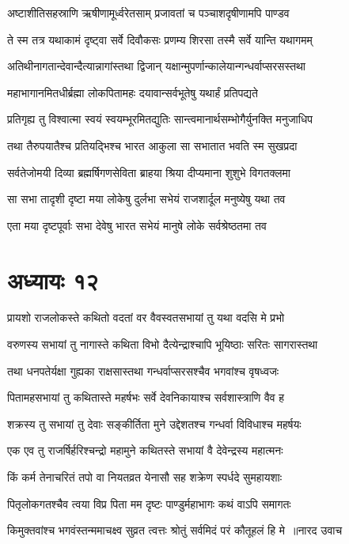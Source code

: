 \twolineshloka
{अष्टाशीतिसहस्राणि ऋषीणामूर्ध्वरेतसाम्}
{प्रजावतां च पञ्चाशदृषीणामपि पाण्डव}


\twolineshloka
{ते स्म तत्र यथाकामं दृष्ट्वा सर्वे दिवौकसः}
{प्रणम्य शिरसा तस्मै सर्वे यान्ति यथागमम्}


\twolineshloka
{अतिथीनागतान्देवान्दैत्यान्नागांस्तथा द्विजान्}
{यक्षान्मुपर्णान्कालेयान्गन्धर्वाप्सरसस्तथा}


\twolineshloka
{महाभागानमितधीर्ब्रह्मा लोकपितामहः}
{दयावान्सर्वभूतेषु यथार्हं प्रतिपद्यते}


\twolineshloka
{प्रतिगृह्य तु विश्वात्मा स्वयं स्वयम्भूरमितद्युतिः}
{सान्त्वमानार्थसम्भोगैर्युनक्ति मनुजाधिप}


\twolineshloka
{तथा तैरुपयातैश्च प्रतियद्भिश्च भारत}
{आकुला सा सभातात भवति स्म सुखप्रदा}


\twolineshloka
{सर्वतेजोमयी दिव्या ब्रह्मर्षिगणसेविता}
{ब्राहया श्रिया दीप्यमाना शुशुभे विगतक्लमा}


\twolineshloka
{सा सभा तादृशी दृष्टा मया लोकेषु दुर्लभा}
{सभेयं राजशार्दूल मनुष्येषु यथा तव}


\twolineshloka
{एता मया दृष्टपूर्वाः सभा देवेषु भारत}
{सभेयं मानुषे लोके सर्वश्रेष्ठतमा तव}


\chapter{अध्यायः १२}
\twolineshloka
{प्रायशो राजलोकस्ते कथितो वदतां वर}
{वैवस्वतसभायां तु यथा वदसि मे प्रभो}


\twolineshloka
{वरुणस्य सभायां तु नागास्ते कथिता विभो}
{दैत्येन्द्राश्चापि भूयिष्ठाः सरितः सागरास्तथा}


\twolineshloka
{तथा धनपतेर्यक्षा गुह्यका राक्षसास्तथा}
{गन्धर्वाप्सरसश्चैव भगवांश्च वृषध्वजः}


\twolineshloka
{पितामहसभायां तु कथितास्ते महर्षभः}
{सर्वे देवनिकायाश्च सर्वशास्त्राणि वैव ह}


\twolineshloka
{शक्रस्य तु सभायां तु देवाः सङ्कीर्तिता मुने}
{उद्देशतश्च गन्धर्वा विविधाश्च महर्षयः}


\twolineshloka
{एक एव तु राजर्षिर्हरिश्चन्द्रो महामुने}
{कथितस्ते सभायां वै देवेन्द्रस्य महात्मनः}


\twolineshloka
{किं कर्म तेनाचरितं तपो वा नियतव्रत}
{येनासौ सह शक्रेण स्पर्धदे सुमहायशाः}


\twolineshloka
{पितृलोकगतश्चैव त्वया विप्र पिता मम}
{दृष्टः पाण्डुर्महाभागः कथं वाऽपि समागतः}


\threelineshloka
{किमुक्तवांश्च भगवंस्तन्ममाचक्ष्व सुव्रत}
{त्वत्तः श्रोतुं सर्वमिदं परं कौतूहलं हि मे ॥नारद उवाच}
{}


